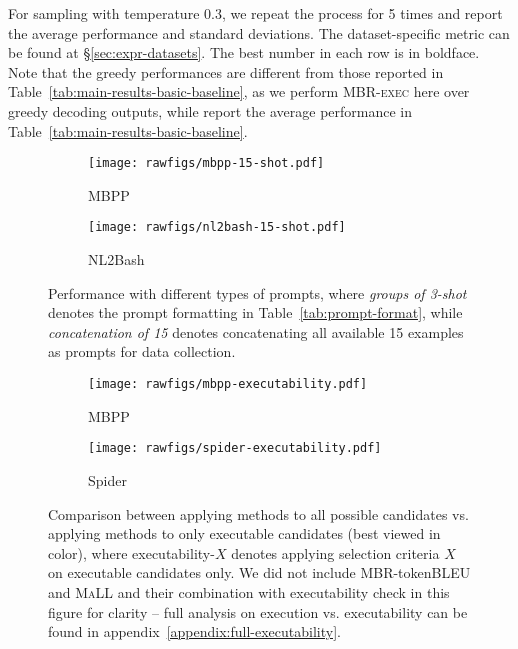 \documentclass[11pt]{article}
\newcommand{\mbrexec}{\textsc{MBR-exec}\xspace}
\newcommand{\maxavglikelihood}{\textsc{MaLL}\xspace}
\begin{document}
\begin{table}[t]
{    For sampling with temperature 0.3, we repeat the process for 5 times and report the average performance and standard deviations.
    The dataset-specific metric can be found at \S\ref{sec:expr-datasets}.
    The best number in each row is in boldface. 
    Note that the greedy performances are different from those reported in Table~\ref{tab:main-results-basic-baseline}, as we perform \mbrexec here over greedy decoding outputs, while report the average performance in Table~\ref{tab:main-results-basic-baseline}.
}
\end{table} \begin{figure}[t!]
    \centering
    \begin{subfigure}[t]{0.48\textwidth}
        \texttt{[image: rawfigs/mbpp-15-shot.pdf]}
        \caption{MBPP}
    \end{subfigure}
    \begin{subfigure}[t]{0.48\textwidth}
        \texttt{[image: rawfigs/nl2bash-15-shot.pdf]}
        \caption{NL2Bash}
    \end{subfigure}
    \caption{Performance with different types of prompts, where \textit{groups of 3-shot} denotes the prompt formatting in Table~\ref{tab:prompt-format}, while \textit{concatenation of 15} denotes concatenating all available 15 examples as prompts for data collection. }
    \label{fig:15-shot}
\end{figure} \begin{figure}[t]
    \centering
    \begin{subfigure}[t]{0.48\textwidth}
        \texttt{[image: rawfigs/mbpp-executability.pdf]}
        \caption{MBPP}
    \end{subfigure}
    \hspace{-10pt}
    \begin{subfigure}[t]{0.48\textwidth}
        \texttt{[image: rawfigs/spider-executability.pdf]}
        \caption{Spider}
    \end{subfigure}
    \caption{Comparison between applying methods to all possible candidates vs. applying methods to only executable candidates (best viewed in color), where executability-$X$ denotes applying selection criteria $X$ on executable candidates only. We did not include MBR-token\textsc{BLEU} and \maxavglikelihood and their combination with executability check in this figure for clarity -- full analysis on execution vs. executability can be found in appendix~\ref{appendix:full-executability}.}
    \label{fig:ablation-executability}

\end{figure}
\end{document}
